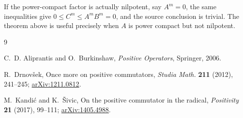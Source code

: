 \documentclass[11pt]{article}
\begin{document}
If the power-compact factor is actually nilpotent, say $A^m=0$, the same
inequalities give $0\leq C^m\leq A^mB^m=0$, and the source conclusion is
trivial.  The theorem above is useful precisely when $A$ is power compact but
not nilpotent.

\begin{thebibliography}{9}

C.~D. Aliprantis and O.~Burkinshaw,
\emph{Positive Operators}, Springer, 2006.

R.~Drnov\v{s}ek,
Once more on positive commutators,
\emph{Studia Math.} \textbf{211} (2012), 241--245;
\href{https://arxiv.org/abs/1211.0812}{arXiv:1211.0812}.

M.~Kandi\'c and K.~\v{S}ivic,
On the positive commutator in the radical,
\emph{Positivity} \textbf{21} (2017), 99--111;
\href{https://arxiv.org/abs/1405.4988}{arXiv:1405.4988}.

\end{thebibliography}
\end{document}

